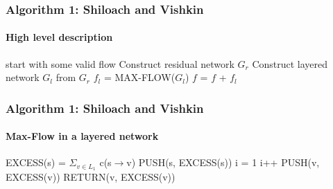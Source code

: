 \documentclass{beamer}
\begin{document}
\begin{frame}
\frametitle{Algorithm 1: Shiloach and Vishkin}
\framesubtitle{High level description}
	\begin{algorithmic}[1]
	\State start with some valid flow 
	 \Comment{\textcolor{OliveGreen}{$O(n)$}}	
		\State Construct residual network $G_r$ \Comment{\textcolor{OliveGreen}{$O(n)$, $p=On)$}}
		\State Construct layered network $G_l$ from $G_r$ 
		\State $f_l$ = MAX-FLOW($G_l$)  
		\State $f$ = $f$ + $f_l$ \Comment{\textcolor{OliveGreen}{$O(n)$}}
	\EndWhile
	\EndFunction
	\end{algorithmic}
\end{frame}

\begin{frame}
\frametitle{Algorithm 1: Shiloach and Vishkin}
\framesubtitle{Max-Flow in a layered network}	
	\begin{algorithmic}[1]
		\State EXCESS(s) = $\Sigma_{v \in L_1}$ c(s$\rightarrow$v)
		\State PUSH(s, EXCESS(s))
		\State i = 1
			\State i++
				\State PUSH(v, EXCESS(v))
			\EndIf
			\State RETURN(v, EXCESS(v))
		\EndWhile
	
	\EndFunction
	\end{algorithmic}
\end{frame}
\end{document}
